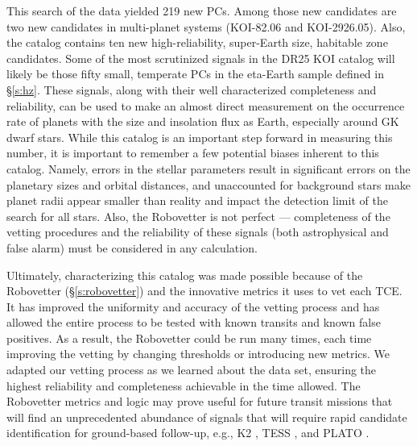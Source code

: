 This search of the \Kepler{} data yielded 219 new PCs. Among those new candidates are two new candidates in multi-planet systems (KOI-82.06 and KOI-2926.05).  Also, the catalog contains ten new high-reliability, super-Earth size, habitable zone candidates.  Some of the most scrutinized signals in the DR25 KOI catalog will likely be those fifty small, temperate PCs in the eta-Earth sample defined in \S\ref{s:hz}.  These signals, along with their well characterized completeness and reliability, can be used to make an almost direct measurement on the occurrence rate of planets with the size and insolation flux as Earth, especially around GK dwarf stars.  While this catalog is an important step forward in measuring this number, it is important to remember a few potential biases inherent to this catalog. Namely, errors in the stellar parameters result in significant errors on the planetary sizes and orbital distances, and unaccounted for background stars make planet radii appear smaller than reality and impact the detection limit of the search for all stars.  Also, the Robovetter is not perfect --- completeness of the vetting procedures and the reliability of these signals (both astrophysical and false alarm) must be considered in any calculation.


Ultimately, characterizing this catalog was made possible because of the Robovetter (\S\ref{s:robovetter}) and the innovative metrics it uses to vet each TCE. It has improved the uniformity and accuracy of the vetting process and has allowed the entire process to be tested with known transits and known false positives. As a result, the Robovetter could be run many times, each time improving the vetting by changing thresholds or introducing new metrics. We adapted our vetting process as we learned about the data set, ensuring the highest reliability and completeness achievable in the time allowed.  The Robovetter metrics and logic may prove useful for future transit missions that will find an unprecedented abundance of signals that will require rapid candidate identification for ground-based follow-up, e.g., K2 \citep{Howell2014}, TESS \citep{Ricker2015}, and PLATO \citep{Rauer2016}.  


